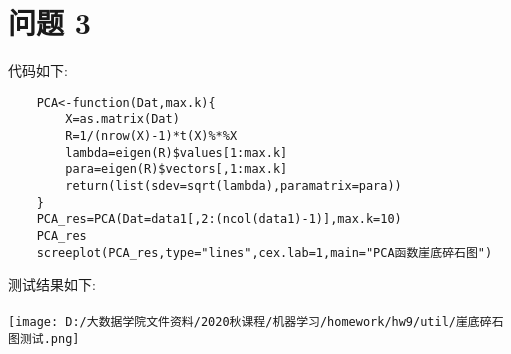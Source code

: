 \documentclass[]{article}
\begin{document}
\section{问题 3}
代码如下:
\begin{lstlisting}
	PCA<-function(Dat,max.k){
		X=as.matrix(Dat) 
		R=1/(nrow(X)-1)*t(X)%*%X 
		lambda=eigen(R)$values[1:max.k] 
		para=eigen(R)$vectors[,1:max.k] 
		return(list(sdev=sqrt(lambda),paramatrix=para))
	}
	PCA_res=PCA(Dat=data1[,2:(ncol(data1)-1)],max.k=10)
	PCA_res
	screeplot(PCA_res,type="lines",cex.lab=1,main="PCA函数崖底碎石图")
\end{lstlisting}
测试结果如下:\\\\
\texttt{[image: D:/大数据学院文件资料/2020秋课程/机器学习/homework/hw9/util/崖底碎石图测试.png]}\\\\
\end{document}
